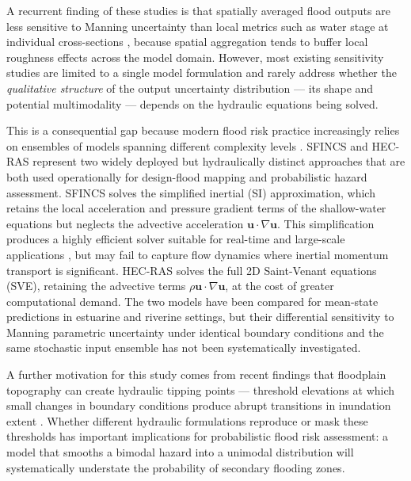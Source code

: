 \documentclass[review,12pt]{elsarticle}
\newcommand{\sfincs}{\textsc{SFINCS}}
\newcommand{\hecras}{\textsc{HEC-RAS}}
\begin{document}
A recurrent finding of these studies is that spatially averaged flood outputs
are less sensitive to Manning uncertainty than local metrics such as water
stage at individual cross-sections \citep{pappenberger2005, fewtrell2011},
because spatial aggregation tends to buffer local roughness effects across
the model domain.
However, most existing sensitivity studies are limited to a single model
formulation and rarely address whether the \emph{qualitative structure} of
the output uncertainty distribution --- its shape and potential multimodality ---
depends on the hydraulic equations being solved.

This is a consequential gap because modern flood risk practice increasingly
relies on ensembles of models spanning different complexity levels
\citep{teng2017, vandaele2024, liu2019}.
\sfincs{} \citep{deltares2023sfincs, leijnse2021} and \hecras{}
\citep{usace2021hecras} represent two widely deployed but hydraulically
distinct approaches that are both used operationally for design-flood mapping
and probabilistic hazard assessment.
\sfincs{} solves the simplified inertial (SI) approximation, which retains the
local acceleration and pressure gradient terms of the shallow-water equations
but neglects the advective acceleration $\mathbf{u}\cdot\nabla\mathbf{u}$.
This simplification produces a highly efficient solver suitable for real-time
and large-scale applications \citep{bates2010, neal2012}, but may fail to
capture flow dynamics where inertial momentum transport is significant.
\hecras{} solves the full 2D Saint-Venant equations (SVE), retaining the
advective terms $\rho\mathbf{u}\cdot\nabla\mathbf{u}$, at the cost of
greater computational demand.
The two models have been compared for mean-state predictions in estuarine
\citep{kumbier2019} and riverine \citep{horritt2002} settings, but their
differential sensitivity to Manning parametric uncertainty under identical
boundary conditions and the same stochastic input ensemble has not been
systematically investigated.

A further motivation for this study comes from recent findings that
floodplain topography can create hydraulic tipping points --- threshold
elevations at which small changes in boundary conditions produce abrupt
transitions in inundation extent \citep{apel2008}.
Whether different hydraulic formulations reproduce or mask these thresholds
has important implications for probabilistic flood risk assessment: a model
that smooths a bimodal hazard into a unimodal distribution will systematically
understate the probability of secondary flooding zones.
\end{document}
